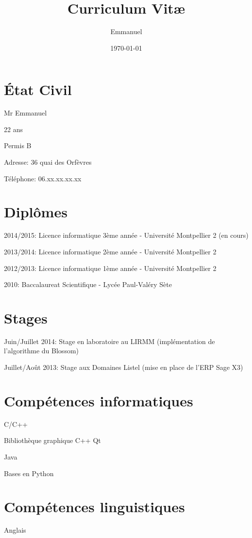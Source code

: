 \documentclass[a4paper]{article}
\title{Curriculum Vit\ae}
\author{Emmanuel}
\date{\today}
\begin{document}
\maketitle

\section*{État Civil}

Mr Emmanuel

22 ans

Permis B

Adresse: 36 quai des Orfèvres

Téléphone: 06.xx.xx.xx.xx


\section*{Diplômes}

2014/2015: Licence informatique 3ème année - Université Montpellier 2 (en cours)

2013/2014: Licence informatique 2ème année - Université Montpellier 2

2012/2013: Licence informatique 1ème année - Université Montpellier 2

2010: Baccalaureat Scientifique - Lycée Paul-Valéry Sète

\section*{Stages}

Juin/Juillet 2014: Stage en laboratoire au LIRMM (implémentation de l'algorithme du Blossom)

Juillet/Août 2013: Stage aux Domaines Listel (mise en place de l'ERP Sage X3)

\section*{Compétences informatiques}

C/C++

Bibliothèque graphique C++ Qt

Java

Bases en Python

\section*{Compétences linguistiques}

Anglais
\end{document}
